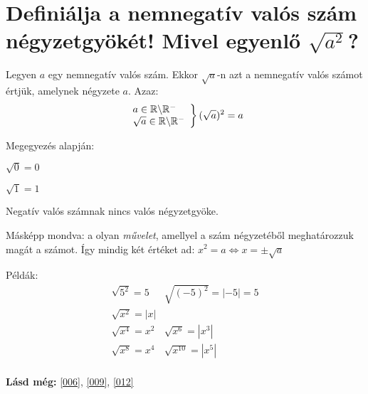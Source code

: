 
\section{Definiálja a nemnegatív valós szám négyzetgyökét! Mivel egyenlő
\texorpdfstring{$\sqrt{a^2}$}{sqrt(a**2)}?}
\label{008}

\begin{defin}[Négyzetgyök]
Legyen $a$ egy nemnegatív valós szám. Ekkor $\sqrt{a}$-n azt a nemnegatív valós
számot értjük, amelynek négyzete $a$. Azaz:
\[
\left.
\begin{array}{l}
  a \in \mathbb{R} \backslash \mathbb{R}^-\\
  \sqrt{a} \in \mathbb{R} \backslash \mathbb{R}^-
\end{array}
\right\} 
(\sqrt{a})^2 = a
\]

Megegyezés alapján:

$\sqrt{0} = 0$

$\sqrt{1} = 1$

Negatív valós számnak nincs valós négyzetgyöke.

Másképp mondva: a  olyan \emph{művelet}, amellyel a
szám négyzetéből meghatározzuk magát a számot. Így mindig két értéket ad:
$x^2 = a \Leftrightarrow x = \pm \sqrt{a}$
\end{defin}

Példák:
\[
\begin{array}{l|r}
  \sqrt{5^2} = 5   & \sqrt{(-5)^2} = |-5| = 5\\\hline
  \sqrt{x^2} = |x| & \\\hline
  \sqrt{x^4} = x^2 & \sqrt{x^6} = |x^3|\\\hline
  \sqrt{x^8} = x^4 & \sqrt{x^{10}} = |x^5|\\
\end{array}
\]

\textbf{Lásd még:} \ref{006}, \ref{009}, \ref{012}
